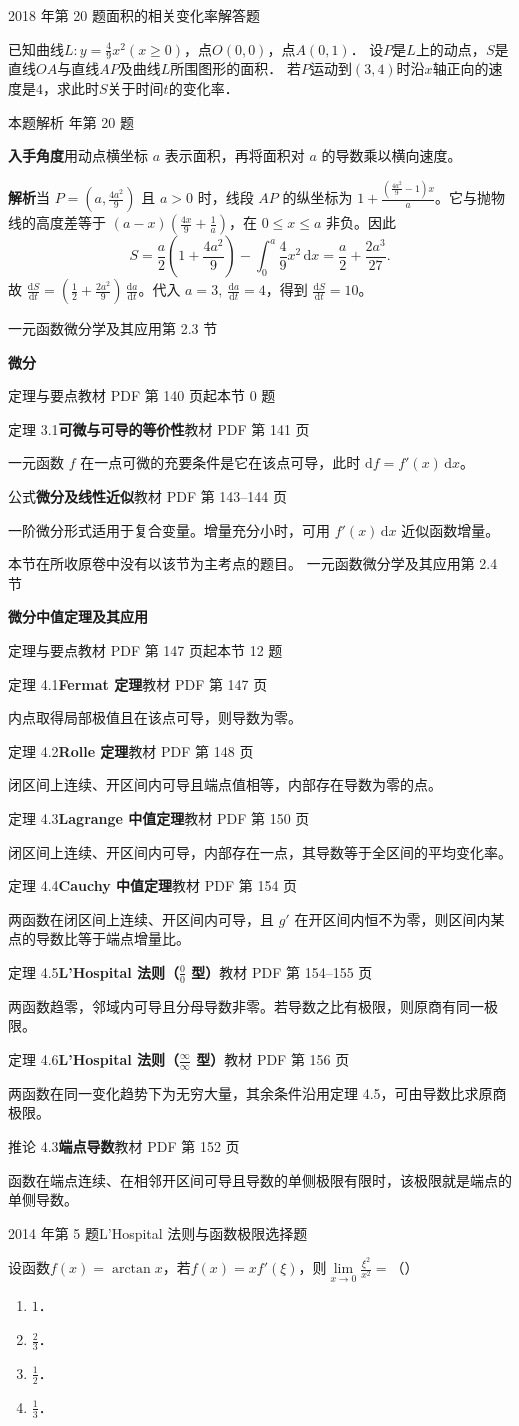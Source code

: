 \documentclass[UTF8,zihao=-4,fontset=fandol]{ctexart}
\renewcommand{\lim}{\operatorname*{lim}\limits}
\newcommand{\SectionHeading}[4]{%
  \clearpage\hypertarget{sec-#1}{}%
  {\small\textcolor{accent}{#2\hfill 第 #1 节}}\par\medskip
  {\LARGE\bfseries #3}\par\smallskip
  {\small\textcolor{muted}{#4}}\par\bigskip}
\newcommand{\Theory}[4]{%
  {\small\textcolor{accent}{#1}\quad\textbf{#3}\hfill\textcolor{muted}{教材 PDF 第 #2 页}}\par
  {\small #4}\par\smallskip}
\newcommand{\pickout}{\hfill（\hspace{1.4em}）}
\newenvironment{abcd}{\begin{enumerate}[label=\textup{(\Alph*)},leftmargin=2.3em,itemsep=1pt,topsep=4pt,parsep=1pt]}{\end{enumerate}}
\newcommand{\QuestionPage}[6]{%
  \par\noindent\begin{minipage}{\linewidth}
  \raggedright
  {\small\textcolor{black!60}{#3\quad #5}\hfill\textcolor{accent}{#2}}\par\smallskip}
\newcommand{\QuestionEnd}{\end{minipage}\par\medskip}
\newcommand{\QuestionPage}[6]{%
  \clearpage
  {\small\textcolor{accent}{#1\hfill #2}}\par\medskip
  {\small\textcolor{black!60}{#3\quad #5\hfill #6}}\par\vspace{9bp}}
\newcommand{\QuestionEnd}{}
\newenvironment{QuestionSolution}[1]{%
  \clearpage
  {\small\textcolor{black!60}{本题解析\quad #1}}\par\medskip
}{\par\clearpage}
\begin{document}
\QuestionPage{2.2 求导的基本法则}{解答题}{2018 年第 20 题}{3}{面积的相关变化率}{083 / 234}
已知曲线$L:y = \frac{4}{9}x^2\left(x \ge 0 \right)$，点$O\left(0,0 \right)$，点$A\left(0,1 \right)$．
设$P$是$L$上的动点，$S$是直线$OA$与直线$AP$及曲线$L$所围图形的面积．
若$P$运动到$\left(3,4 \right)$时沿$x$轴正向的速度是$4$，求此时$S$关于时间$t$的变化率．
\QuestionEnd

\begin{QuestionSolution}{2018 年第 20 题}
\textbf{入手角度}\quad 用动点横坐标 \(a\) 表示面积，再将面积对 \(a\) 的导数乘以横向速度。

\textbf{解析}\quad 当 \(P=(a,\frac{4a^2}{9})\) 且 \(a>0\) 时，线段 \(AP\) 的纵坐标为 \(1+\frac{(\frac{4a^2}{9}-1)x}{a}\)。它与抛物线的高度差等于 \((a-x)(\frac{4x}{9}+\frac{1}{a})\)，在 \(0\le x\le a\) 非负。因此
\[
S=\frac a2\left(1+\frac{4a^2}9\right)-\int_0^a\frac49x^2\,\mathrm{d}x
=\frac a2+\frac{2a^3}{27}.
\]
故 \(\frac{\mathrm{d}S}{\mathrm{d}t}=(\frac{1}{2}+\frac{2a^2}{9})\,\frac{\mathrm{d}a}{\mathrm{d}t}\)。代入 \(a=3,\ \frac{\mathrm{d}a}{\mathrm{d}t}=4\)，得到 \(\boxed{\frac{\mathrm{d}S}{\mathrm{d}t}=10}\)。
\end{QuestionSolution}

\SectionHeading{2.3}{一元函数微分学及其应用}{微分}{定理与要点\quad 教材 PDF 第 140 页起\hfill 本节 0 题}
\Theory{定理 3.1}{141}{可微与可导的等价性}{一元函数 \(f\) 在一点可微的充要条件是它在该点可导，此时 \(\mathrm{d}f=f'(x)\,\mathrm{d}x\)。}
\Theory{公式}{143--144}{微分及线性近似}{一阶微分形式适用于复合变量。增量充分小时，可用 \(f'(x)\,\mathrm{d}x\) 近似函数增量。}
本节在所收原卷中没有以该节为主考点的题目。
\SectionHeading{2.4}{一元函数微分学及其应用}{微分中值定理及其应用}{定理与要点\quad 教材 PDF 第 147 页起\hfill 本节 12 题}
\Theory{定理 4.1}{147}{Fermat 定理}{内点取得局部极值且在该点可导，则导数为零。}
\Theory{定理 4.2}{148}{Rolle 定理}{闭区间上连续、开区间内可导且端点值相等，内部存在导数为零的点。}
\Theory{定理 4.3}{150}{Lagrange 中值定理}{闭区间上连续、开区间内可导，内部存在一点，其导数等于全区间的平均变化率。}
\Theory{定理 4.4}{154}{Cauchy 中值定理}{两函数在闭区间上连续、开区间内可导，且 \(g'\) 在开区间内恒不为零，则区间内某点的导数比等于端点增量比。}
\Theory{定理 4.5}{154--155}{L'Hospital 法则（\(\frac{0}{0}\) 型）}{两函数趋零，邻域内可导且分母导数非零。若导数之比有极限，则原商有同一极限。}
\Theory{定理 4.6}{156}{L'Hospital 法则（\(\frac{\infty}{\infty}\) 型）}{两函数在同一变化趋势下为无穷大量，其余条件沿用定理 4.5，可由导数比求原商极限。}
\Theory{推论 4.3}{152}{端点导数}{函数在端点连续、在相邻开区间可导且导数的单侧极限有限时，该极限就是端点的单侧导数。}
\QuestionPage{2.4 微分中值定理及其应用}{选择题}{2014 年第 5 题}{1}{L'Hospital 法则与函数极限}{084 / 234}
设函数$f(x) = \arctan x$，若$f(x) = xf'(\xi)$，则$\lim_{x \to 0} \frac{\xi^2}{x^2} =$\pickout{}
\begin{abcd}
\item $1$．
\item $\frac{2}{3}$．
\item $\frac{1}{2}$．
\item $\frac{1}{3}$．
\end{abcd}
\QuestionEnd
\end{document}

